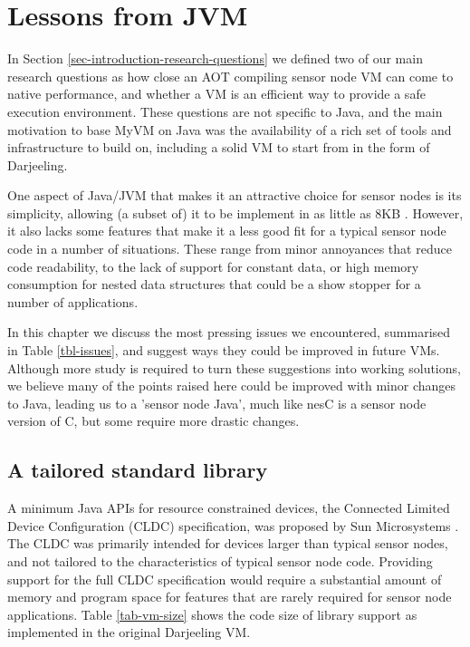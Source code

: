\chapter{Lessons from JVM}



\label{sec-lessons-from-jvm}

In Section \ref{sec-introduction-research-questions} we defined two of our main research questions as how close an AOT compiling sensor node VM can come to native performance, and whether a VM is an efficient way to provide a safe execution environment. These questions are not specific to Java, and the main motivation to base MyVM on Java was the availability of a rich set of tools and infrastructure to build on, including a solid VM to start from in the form of Darjeeling.

One aspect of Java/JVM that makes it an attractive choice for sensor nodes is its simplicity, allowing (a subset of) it to be implement in as little as 8KB \cite{Harbaum}. However, it also lacks some features that make it a less good fit for a typical sensor node code in a number of situations. These range from minor annoyances that reduce code readability, to the lack of support for constant data, or high memory consumption for nested data structures that could be a show stopper for a number of applications.

In this chapter we discuss the most pressing issues we encountered, summarised in Table \ref{tbl-issues}, and suggest ways they could be improved in future VMs. Although more study is required to turn these suggestions into working solutions, we believe many of the points raised here could be improved with minor changes to Java, leading us to a 'sensor node Java', much like nesC \cite{Gay:2003up} is a sensor node version of C, but some require more drastic changes.

\section{A tailored standard library}
\label{sec-std-lib}

 

A minimum Java APIs for resource constrained devices, the Connected Limited Device Configuration (CLDC) specification, was proposed by Sun Microsystems \cite{CLDC}. The CLDC was primarily intended for devices larger than typical sensor nodes, and not tailored to the characteristics of typical sensor node code. Providing support for the full CLDC specification would require a substantial amount of memory and program space for features that are rarely required for sensor node applications. Table \ref{tab-vm-size} shows the code size of library support as implemented in the original Darjeeling VM.

